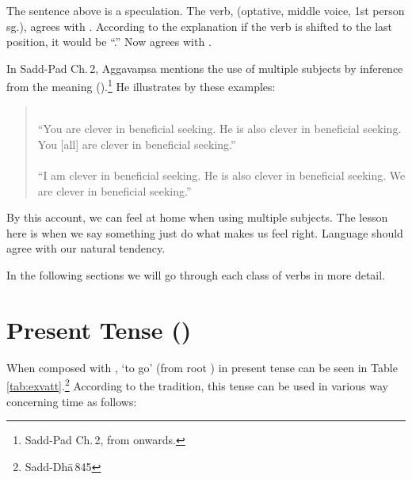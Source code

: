 The sentence above is a speculation. The verb,  (optative, middle voice, 1st person sg.), agrees with . According to the explanation if the verb is shifted to the last position, it would be ``.'' Now  agrees with .

In Sadd-Pad Ch.\,2, Aggava\d msa mentions the use of multiple subjects by inference from the meaning ().\footnote{Sadd-Pad Ch.\,2, from  onwards.} He illustrates by these examples:

\begin{quote}
\\
``You are clever in beneficial seeking. He is also clever in beneficial seeking. You [all] are clever in beneficial seeking.''\\[1.5mm]
\\
``I am clever in beneficial seeking. He is also clever in beneficial seeking. We are clever in beneficial seeking.''\\[1.5mm]
\end{quote}

By this account, we can feel at home when using multiple subjects. The lesson here is when we say something just do what makes us feel right. Language should agree with our natural tendency.

In the following sections we will go through each class of verbs in more detail.

{}
\section*{Present Tense ()}

When composed with , `to go' (from root ) in present tense can be seen in Table \ref{tab:exvatt}.\footnote{Sadd-Dh\=a\,845} According to the tradition, this tense can be used in various way concerning time as follows:

